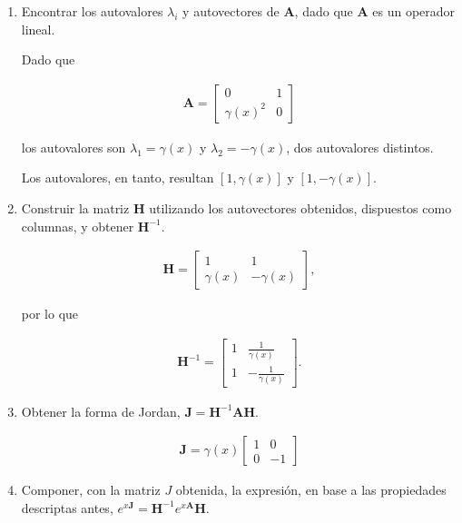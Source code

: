 \begin{enumerate}
	\item Encontrar los autovalores $\lambda_i$ y autovectores de $\textbf{A}$, dado que $\textbf{A}$ es un operador lineal.
	
	Dado que
	
	\begin{align}
	\textbf{A} = 
	\begin{bmatrix}
	0 & 1 \\
	\gamma(x)^2 & 0
	\end{bmatrix}
	\end{align}
	
	los autovalores son $\lambda_1 = \gamma(x)$ y $\lambda_2 = -\gamma(x)$, dos autovalores distintos.
	
	Los autovalores, en tanto, resultan $[1,\gamma(x)]$ y $[1,-\gamma(x)]$.
	
	\item Construir la matriz $\textbf{H}$ utilizando los autovectores obtenidos, dispuestos como columnas, y obtener $\textbf{H}^{-1}$.
	
	\begin{align}
	\textbf{H} = 
	\begin{bmatrix}
	1 & 1 \\
	\gamma(x) & -\gamma(x)
	\end{bmatrix},
	\end{align}
	
	por lo que
	
	\begin{align}
	\textbf{H}^{-1} = 
	\begin{bmatrix}
	1 & \frac{1}{\gamma(x)} \\
	1 & -\frac{1}{\gamma(x)}
	\end{bmatrix}.
	\end{align}	
	
	\item Obtener la forma de Jordan, $\textbf{J} = \textbf{H}^{-1} \textbf{A} \textbf{H}$.
	
	\begin{align}
	\textbf{J} = \gamma(x) 
	\begin{bmatrix}
	1 & 0 \\
	0 & -1
	\end{bmatrix}
	\end{align}
	
	\item Componer, con la matriz $J$ obtenida, la expresión, en base a las propiedades descriptas antes, $e^{x\textbf{J}} = \textbf{H}^{-1} e^{x\textbf{A}} \textbf{H}$.
	

\end{enumerate}
